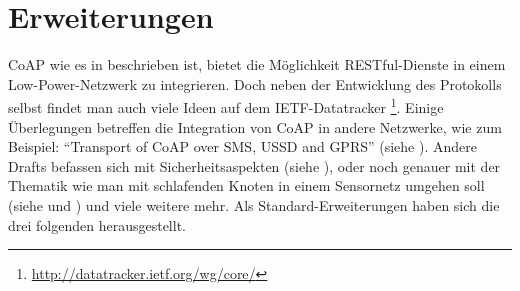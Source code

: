 \section{Erweiterungen}
\ac{CoAP} wie es in \cite{draft-ietf-core-coap-13} beschrieben ist,
bietet die Möglichkeit \ac{REST}ful-Dienste in einem Low-Power-Netzwerk zu integrieren.
Doch neben der Entwicklung des Protokolls selbst findet man auch viele Ideen auf
dem \ac{IETF}-Datatracker \footnote{\url{http://datatracker.ietf.org/wg/core/}}.
Einige Überlegungen betreffen die Integration von \ac{CoAP} in andere Netzwerke, wie
zum Beispiel: "`Transport of \ac{CoAP} over \ac{SMS}, \ac{USSD} and \ac{GPRS}"'
(siehe \cite{draft-becker-core-coap-sms-gprs-03}).
Andere Drafts befassen sich mit Sicherheitsaspekten
(siehe \cite{draft-bormann-core-ipsec-for-coap-00}), oder noch genauer mit der Thematik wie man
mit schlafenden Knoten in einem Sensornetz umgehen soll
(siehe \cite{draft-rahman-core-sleepy-01} und \cite{draft-rahman-core-sleepy-problem-statement-01}) und viele
weitere mehr.
Als Standard-Erweiterungen haben sich die drei folgenden herausgestellt.
